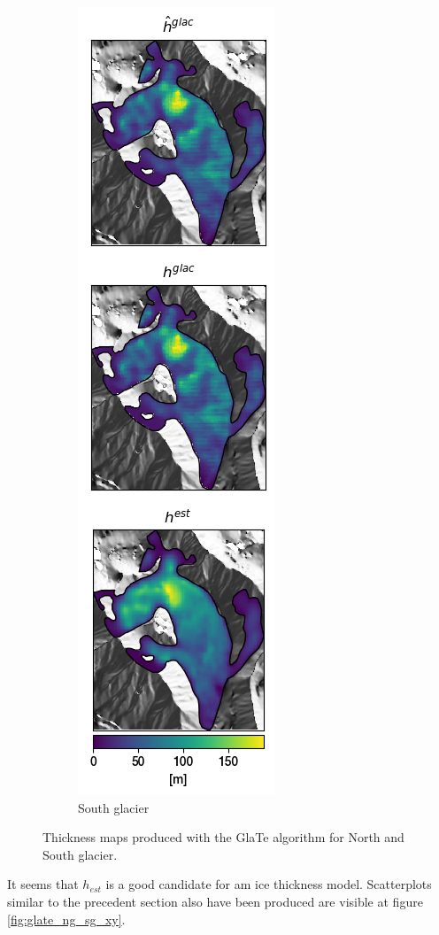 \documentclass[a4, 12pt]{article}
\begin{document}
\begin{figure}[h!]
{\begin{subfigure}{0.35\linewidth}
\includegraphics{../imgs/South glacier/glate_thickness_all_models.png}
\caption{South glacier}
\label{fig:glate_sg_thickness}
\end{subfigure}
}
\label{fig:glate_ng_sg_thickness}
\caption{Thickness maps produced with the GlaTe algorithm for North and South glacier.}
\end{figure}

It seems that $h_{est}$ is a good candidate for am ice thickness model. Scatterplots similar to the precedent section also have been produced are visible at figure \ref{fig:glate_ng_sg_xy}.\\
\end{document}
